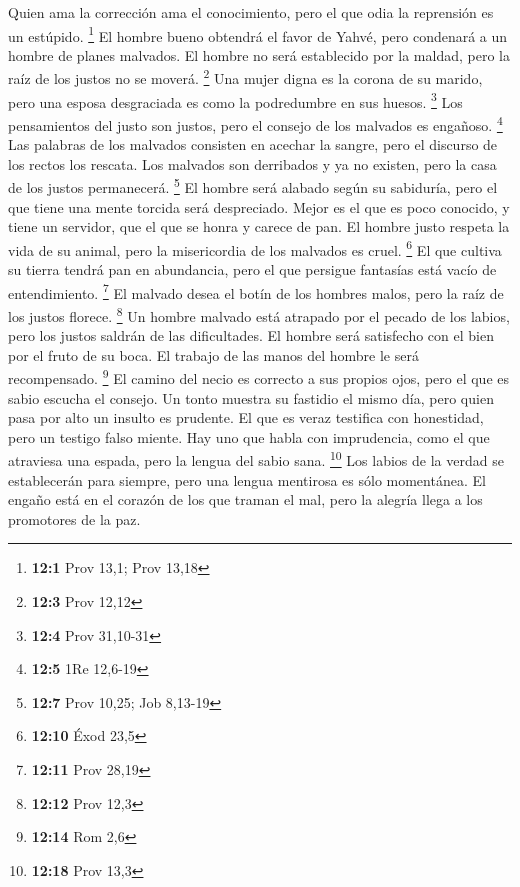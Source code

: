  Quien ama la corrección ama el conocimiento, pero el que
odia la reprensión es un estúpido. \footnote{\textbf{12:1} Prov 13,1;
  Prov 13,18}  El hombre bueno obtendrá el favor de Yahvé,
pero condenará a un hombre de planes malvados.  El hombre
no será establecido por la maldad, pero la raíz de los justos no se
moverá. \footnote{\textbf{12:3} Prov 12,12}  Una mujer
digna es la corona de su marido, pero una esposa desgraciada es como la
podredumbre en sus huesos. \footnote{\textbf{12:4} Prov 31,10-31}
 Los pensamientos del justo son justos, pero el consejo de
los malvados es engañoso. \footnote{\textbf{12:5} 1Re 12,6-19}
 Las palabras de los malvados consisten en acechar la
sangre, pero el discurso de los rectos los rescata.  Los
malvados son derribados y ya no existen, pero la casa de los justos
permanecerá. \footnote{\textbf{12:7} Prov 10,25; Job 8,13-19}
 El hombre será alabado según su sabiduría, pero el que
tiene una mente torcida será despreciado.  Mejor es el que
es poco conocido, y tiene un servidor, que el que se honra y carece de
pan.  El hombre justo respeta la vida de su animal, pero
la misericordia de los malvados es cruel. \footnote{\textbf{12:10} Éxod
  23,5}  El que cultiva su tierra tendrá pan en
abundancia, pero el que persigue fantasías está vacío de entendimiento.
\footnote{\textbf{12:11} Prov 28,19}  El malvado desea el
botín de los hombres malos, pero la raíz de los justos florece.
\footnote{\textbf{12:12} Prov 12,3}  Un hombre malvado
está atrapado por el pecado de los labios, pero los justos saldrán de
las dificultades.  El hombre será satisfecho con el bien
por el fruto de su boca. El trabajo de las manos del hombre le será
recompensado. \footnote{\textbf{12:14} Rom 2,6}  El
camino del necio es correcto a sus propios ojos, pero el que es sabio
escucha el consejo.  Un tonto muestra su fastidio el
mismo día, pero quien pasa por alto un insulto es prudente.
 El que es veraz testifica con honestidad, pero un
testigo falso miente.  Hay uno que habla con imprudencia,
como el que atraviesa una espada, pero la lengua del sabio sana.
\footnote{\textbf{12:18} Prov 13,3}  Los labios de la
verdad se establecerán para siempre, pero una lengua mentirosa es sólo
momentánea.  El engaño está en el corazón de los que
traman el mal, pero la alegría llega a los promotores de la paz.
